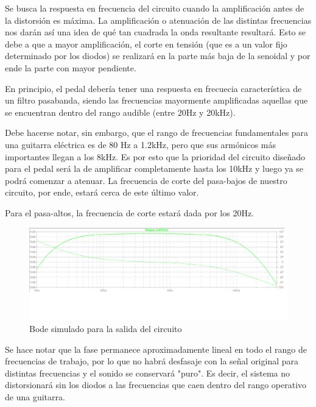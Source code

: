 \documentclass[../../main.tex]{subfiles}
\begin{document}
Se busca la respuesta en frecuencia del circuito cuando la amplificación antes de la distorsión es máxima. La amplificación o atenuación de las distintas frecuencias nos darán así una idea de qué tan cuadrada la onda resultante resultará. Esto se debe a que a mayor amplificación, el corte en tensión (que es a un valor fijo determinado por los diodos) se realizará en la parte más baja de la senoidal y por ende la parte con mayor pendiente. \par
En principio, el pedal debería tener una respuesta en frecuecia característica de un filtro pasabanda, siendo las frecuencias mayormente amplificadas aquellas que se encuentran dentro del rango audible (entre 20Hz y 20kHz).\par
Debe hacerse notar, sin embargo, que el rango de frecuencias fundamentales para una guitarra eléctrica es de 80 Hz a 1.2kHz, pero que sus armónicos más importantes llegan a los 8kHz. Es por esto que la prioridad del circuito diseñado para el pedal será la de amplificar completamente hasta los 10kHz y luego ya se podrá comenzar a atenuar. La frecuencia de corte del pasa-bajos de nuestro circuito, por ende, estará cerca de este último valor.\par
Para el pasa-altos, la frecuencia de corte estará dada por los 20Hz.

\begin{figure}[H]
	\includegraphics[scale=.4]{imagenes/Bode_simulacion.png}
	\caption{Bode simulado para la salida del circuito}
	\label{fig:ej5_Bode_simulacion}
\end{figure}
 
Se hace notar que la fase permanece aproximadamente lineal en todo el rango de frecuencias de trabajo, por lo que no habrá desfasaje con la señal original para distintas frecuencias y el sonido se conservará "puro". Es decir, el sistema no distorsionará sin los diodos a las frecuencias que caen dentro del rango operativo de una guitarra.\par
\end{document}
